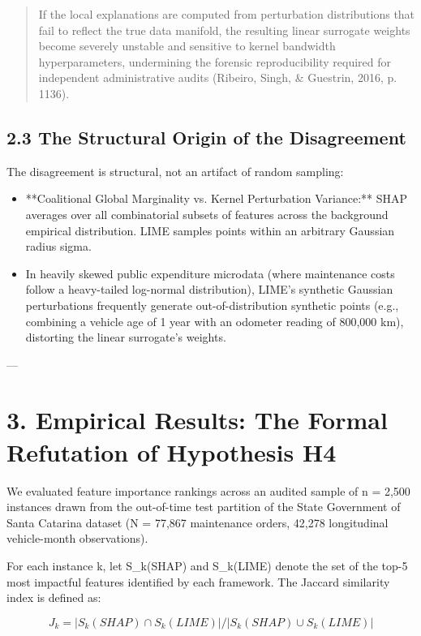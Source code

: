 \documentclass[10pt,a4paper,journal]{article}
\begin{document}
\begin{quote}
\small If the local explanations are computed from perturbation distributions that fail to reflect the true data manifold, the resulting linear surrogate weights become severely unstable and sensitive to kernel bandwidth hyperparameters, undermining the forensic reproducibility required for independent administrative audits (Ribeiro, Singh, \& Guestrin, 2016, p. 1136).
\end{quote}
\subsection{2.3 The Structural Origin of the Disagreement}
The disagreement is structural, not an artifact of random sampling:

\begin{itemize}
\item **Coalitional Global Marginality vs. Kernel Perturbation Variance:** SHAP averages over all combinatorial subsets of features across the background empirical distribution. LIME samples points within an arbitrary Gaussian radius sigma.
\end{itemize}
\begin{itemize}
\item In heavily skewed public expenditure microdata (where maintenance costs follow a heavy-tailed log-normal distribution), LIME's synthetic Gaussian perturbations frequently generate out-of-distribution synthetic points (e.g., combining a vehicle age of 1 year with an odometer reading of 800,000 km), distorting the linear surrogate's weights.
\end{itemize}
---

\section{3. Empirical Results: The Formal Refutation of Hypothesis H4}
We evaluated feature importance rankings across an audited sample of n = 2,500 instances drawn from the out-of-time test partition of the State Government of Santa Catarina dataset (N = 77,867 maintenance orders, 42,278 longitudinal vehicle-month observations).

For each instance k, let S\_k(SHAP) and S\_k(LIME) denote the set of the top-5 most impactful features identified by each framework. The Jaccard similarity index is defined as:

\begin{equation}
J_{k} = | S_{k}(SHAP) \cap S_{k}(LIME) | / | S_{k}(SHAP) \cup S_{k}(LIME) | \label{eq:4}
\end{equation}
\end{document}
